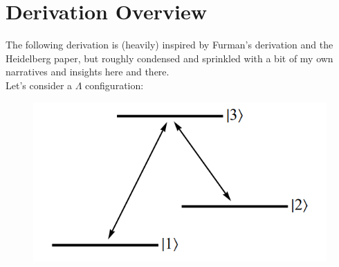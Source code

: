 \documentclass{article}
\theoremstyle{definition}
\begin{document}
\section{Derivation Overview}

The following derivation is (heavily) inspired by Furman's derivation and the Heidelberg paper, but roughly condensed and sprinkled with a bit of my own narratives and insights here and there. \\

Let's consider a $\Lambda$ configuration:
\begin{figure}[h!]
	\centering
	\includegraphics[scale=0.5]{Lambda.PNG}
	\caption{}
\end{figure}
\end{document}
